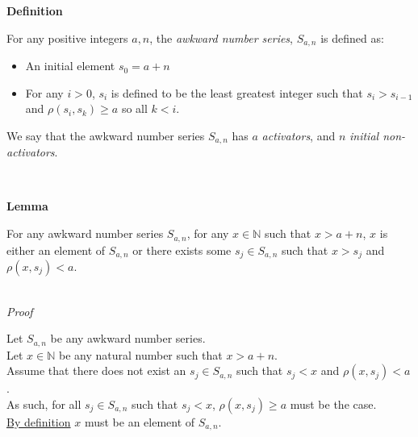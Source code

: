 \documentclass[a4paper,12pt]{article}
\begin{document}
\label{definition:awkward_number_series}
\hypertarget{definition:awkward_number_series}{}
\begin{tcolorbox}
\textbf{Definition}

\noindent For any positive integers $a, n$, the \textit{awkward number series}, $S_{a, n}$ is defined as:

\begin{itemize}
\item An initial element $s_0 = a + n$
\item For any $i > 0$, $s_i$ is defined to be the least greatest integer such that $s_i > s_{i - 1}$ and $\rho(s_i, s_k) \geq a$ so all $k < i$.
\end{itemize}


\noindent We say that the awkward number series $S_{a,n}$ has $a$ \textit{activators}, and $n$ \textit{initial non-activators}.

\end{tcolorbox}
\noindent \\









\label{lemma:exists_element_less_than_x}
\hypertarget{lemma:exists_element_less_than_x}{}
\begin{tcolorbox}
\textbf{Lemma}

For any awkward number series $S_{a, n}$, for any $x \in \mathbb{N}$ such that $x > a + n$, $x$ is either an element of $S_{a, n}$ or there exists some $s_j \in S_{a, n}$ such that $x > s_j$ and $\rho(x, s_j) < a$. 
\end{tcolorbox}

\noindent \\
\textit{Proof}

\noindent Let $S_{a, n}$ be any awkward number series.\\

\noindent Let $x \in \mathbb{N}$ be any natural number such that $x > a + n$.\\

\noindent Assume that there does not exist an $s_j \in S_{a, n}$ such that $s_j < x$ and $\rho(x, s_j) < a$.\\

\noindent As such, for all $s_j \in S_{a, n}$ such that $s_j < x$, $\rho(x, s_j) \geq a$ must be the case.\\

\noindent \hyperlink{definition:awkward_number_series}{By definition} $x$ must be an element of $S_{a, n}$.\\
\end{document}
